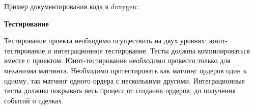 Пример документирования кода в doxygen:



\textbf{Тестирование}

Тестирование проекта необходимо осуществить на двух уровнях: юнит-тестирование и интеграционное тестирование. Тесты должны компилироваться вместе с проектом. Юнит-тестирование необходимо провести только для механизма матчинга. Необходимо протестировать как матчинг ордеров один к одному, так матчинг одного ордера с несколькими другими. Интеграционные тесты должны покрывать весь процесс от создания ордеров, до получения событий о сделках.
